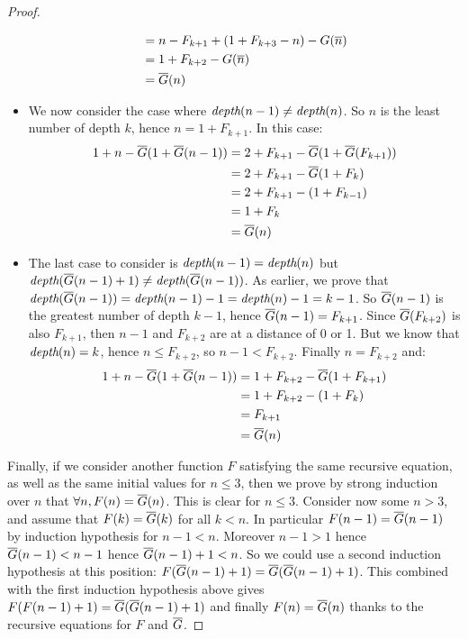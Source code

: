 \documentclass[a4paper,11pt]{article}
\begin{document}
\begin{proof}
\begin{itemize}
\begin{align*}
                    & = n-F_{k+1}+(1+F_{k+3}-n)-G(\overline{n}) \\
                    & = 1+F_{k+2}-G(\overline{n}) \\
                    & = \overline{G}(n)
\end{align*}
\item We now consider the case where $\textit{depth}(n-1)\neq \textit{depth}(n)$.
So $n$ is the least number of depth $k$, hence $n=1+F_{k+1}$.
In this case:
\begin{align*}
1+n-\overline{G}(1+\overline{G}(n-1)) & = 2+F_{k+1}-\overline{G}(1+\overline{G}(F_{k+1})) \\
                    & = 2+F_{k+1}-\overline{G}(1+F_{k}) \\
                    & = 2+F_{k+1}-(1+F_{k-1}) \\
                    & = 1+F_{k} \\
                    & = \overline{G}(n)
\end{align*}
\item The last case to consider is $\textit{depth}(n-1)=\textit{depth}(n)$ but
$\textit{depth}(\overline{G}(n-1)+1)\neq \textit{depth}(\overline{G}(n-1))$. As earlier, we prove
that $\textit{depth}(\overline{G}(n-1))=\textit{depth}(n-1)-1=\textit{depth}(n)-1=k-1$. So
$\overline{G}(n-1)$ is the greatest number of depth $k-1$, hence
$\overline{G}(n-1)=F_{k+1}$. Since $\overline{G}(F_{k+2})$ is also $F_{k+1}$, then $n-1$
and $F_{k+2}$ are at a distance of 0 or 1. But we know that
$\textit{depth}(n)=k$, hence $n \le F_{k+2}$, so $n-1 < F_{k+2}$.
Finally $n=F_{k+2}$ and:
\begin{align*}
1+n-\overline{G}(1+\overline{G}(n-1)) & = 1+F_{k+2}-\overline{G}(1+F_{k+1}) \\
                    & = 1+F_{k+2}-(1+F_{k}) \\
                    & = F_{k+1} \\
                    & = \overline{G}(n)
\end{align*}
\end{itemize}

Finally, if we consider another function $F$ satisfying
the same recursive equation, as well as the same initial values
for $n\le 3$, then we prove by strong induction over $n$ that
$\forall n, F(n)=\overline{G}(n)$. This is clear for $n\le 3$. Consider now
some $n>3$, and assume that $F(k)=\overline{G}(k)$ for all $k<n$.
In particular $F(n-1)=\overline{G}(n-1)$ by induction hypothesis for
$n-1<n$.
Moreover $n-1>1$ hence $\overline{G}(n-1) < n-1$ hence $\overline{G}(n-1)+1<n$.
So we could use a second induction hypothesis at this position:
$F(\overline{G}(n-1)+1)=\overline{G}(\overline{G}(n-1)+1)$. This combined with the first
induction hypothesis above gives $F(F(n-1)+1)=\overline{G}(\overline{G}(n-1)+1)$
and finally $F(n)=\overline{G}(n)$ thanks to the recursive equations
for $F$ and $\overline{G}$.
\end{proof}
\end{document}
